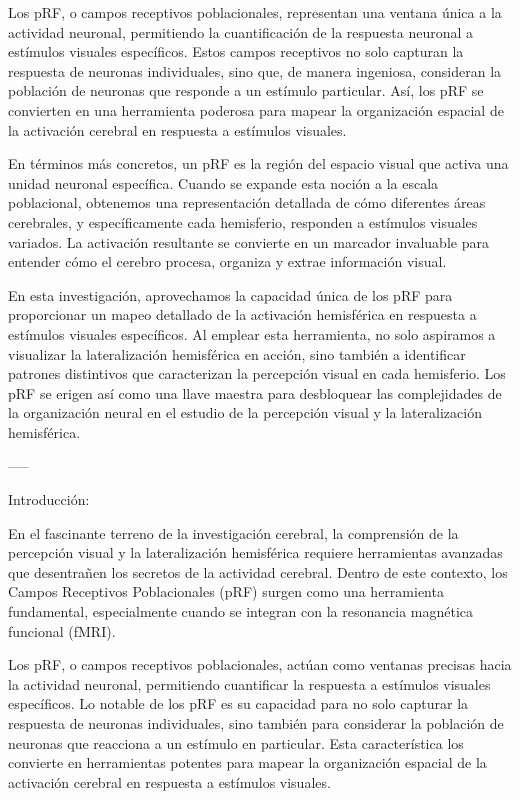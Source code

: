\documentclass{article}
\begin{document}
	Los pRF, o campos receptivos poblacionales, representan una ventana única a la actividad neuronal, permitiendo la cuantificación de la respuesta neuronal a estímulos visuales específicos. Estos campos receptivos no solo capturan la respuesta de neuronas individuales, sino que, de manera ingeniosa, consideran la población de neuronas que responde a un estímulo particular. Así, los pRF se convierten en una herramienta poderosa para mapear la organización espacial de la activación cerebral en respuesta a estímulos visuales.
	
	En términos más concretos, un pRF es la región del espacio visual que activa una unidad neuronal específica. Cuando se expande esta noción a la escala poblacional, obtenemos una representación detallada de cómo diferentes áreas cerebrales, y específicamente cada hemisferio, responden a estímulos visuales variados. La activación resultante se convierte en un marcador invaluable para entender cómo el cerebro procesa, organiza y extrae información visual.
	
	En esta investigación, aprovechamos la capacidad única de los pRF para proporcionar un mapeo detallado de la activación hemisférica en respuesta a estímulos visuales específicos. Al emplear esta herramienta, no solo aspiramos a visualizar la lateralización hemisférica en acción, sino también a identificar patrones distintivos que caracterizan la percepción visual en cada hemisferio. Los pRF se erigen así como una llave maestra para desbloquear las complejidades de la organización neural en el estudio de la percepción visual y la lateralización hemisférica.
	
	-----
	
	Introducción:
	
	En el fascinante terreno de la investigación cerebral, la comprensión de la percepción visual y la lateralización hemisférica requiere herramientas avanzadas que desentrañen los secretos de la actividad cerebral. Dentro de este contexto, los Campos Receptivos Poblacionales (pRF) surgen como una herramienta fundamental, especialmente cuando se integran con la resonancia magnética funcional (fMRI).
	
	Los pRF, o campos receptivos poblacionales, actúan como ventanas precisas hacia la actividad neuronal, permitiendo cuantificar la respuesta a estímulos visuales específicos. Lo notable de los pRF es su capacidad para no solo capturar la respuesta de neuronas individuales, sino también para considerar la población de neuronas que reacciona a un estímulo en particular. Esta característica los convierte en herramientas potentes para mapear la organización espacial de la activación cerebral en respuesta a estímulos visuales.
	
\end{document}
